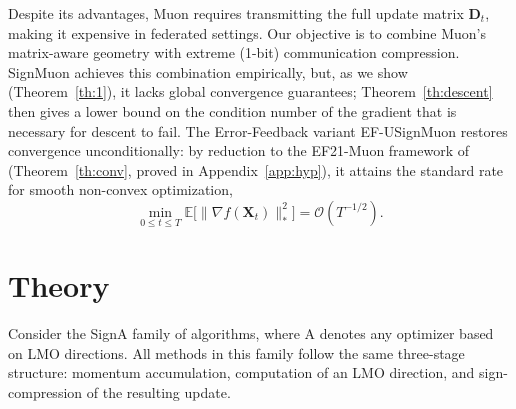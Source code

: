 \documentclass{article}
\begin{document}
Despite its advantages, Muon requires transmitting the full update matrix $\mathbf{D}_t$, making it expensive in federated settings. Our objective is to combine Muon's matrix-aware geometry with extreme (1-bit) communication compression. SignMuon achieves this combination empirically, but, as we show (Theorem~\ref{th:1}), it lacks global convergence guarantees; Theorem~\ref{th:descent} then gives a lower bound on the condition number of the gradient that is necessary for descent to fail. The Error-Feedback variant EF-USignMuon restores convergence unconditionally: by reduction to the EF21-Muon framework of \citet{gruntkowska2025error} (Theorem~\ref{th:conv}, proved in Appendix~\ref{app:hyp}), it attains the standard rate for smooth non-convex optimization,
\begin{equation}
\min_{0 \le t \le T}\mathbb{E}\bigl[\|\nabla f(\mathbf{X}_t)\|_*^2\bigr]
= \mathcal{O}(T^{-1/2}).
\end{equation}


\section{Theory}\label{sec:theory}
Consider the SignA family of algorithms, where A denotes any optimizer based on LMO directions. All methods in this family follow the same three-stage structure: momentum accumulation, computation of an LMO direction, and sign-compression of the resulting update.
\end{document}
